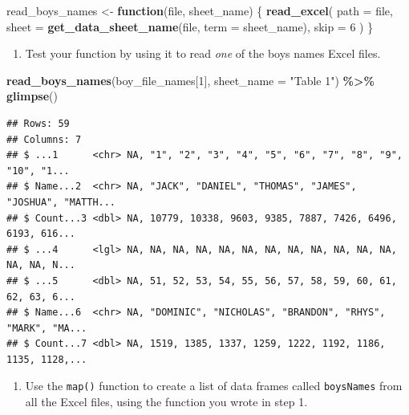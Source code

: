 \documentclass[
]{book}
\newenvironment{Shaded}{\begin{snugshade}}{\end{snugshade}}
\newcommand{\ControlFlowTok}[1]{\textcolor[rgb]{0.13,0.29,0.53}{\textbf{#1}}}
\newcommand{\DataTypeTok}[1]{\textcolor[rgb]{0.13,0.29,0.53}{#1}}
\newcommand{\DecValTok}[1]{\textcolor[rgb]{0.00,0.00,0.81}{#1}}
\newcommand{\KeywordTok}[1]{\textcolor[rgb]{0.13,0.29,0.53}{\textbf{#1}}}
\newcommand{\NormalTok}[1]{#1}
\newcommand{\OperatorTok}[1]{\textcolor[rgb]{0.81,0.36,0.00}{\textbf{#1}}}
\newcommand{\StringTok}[1]{\textcolor[rgb]{0.31,0.60,0.02}{#1}}
\providecommand{\tightlist}{%
  \setlength{\itemsep}{0pt}\setlength{\parskip}{0pt}}
\begin{document}
\begin{Shaded}
\begin{Highlighting}[]
\NormalTok{read\_boys\_names \textless{}{-}}\StringTok{ }\ControlFlowTok{function}\NormalTok{(file, sheet\_name) \{}
  \KeywordTok{read\_excel}\NormalTok{(}
    \DataTypeTok{path =}\NormalTok{ file,}
    \DataTypeTok{sheet =} \KeywordTok{get\_data\_sheet\_name}\NormalTok{(file, }\DataTypeTok{term =}\NormalTok{ sheet\_name),}
    \DataTypeTok{skip =} \DecValTok{6}
\NormalTok{  )}
\NormalTok{\}}
\end{Highlighting}
\end{Shaded}

\begin{enumerate}
\def\labelenumi{\arabic{enumi}.}
\setcounter{enumi}{1}
\tightlist
\item
  Test your function by using it to read \emph{one} of the boys names Excel files.
\end{enumerate}

\begin{Shaded}
\begin{Highlighting}[]
\KeywordTok{read\_boys\_names}\NormalTok{(boy\_file\_names[}\DecValTok{1}\NormalTok{], }\DataTypeTok{sheet\_name =} \StringTok{"Table 1"}\NormalTok{) }\OperatorTok{\%\textgreater{}\%}\StringTok{ }\KeywordTok{glimpse}\NormalTok{()}
\end{Highlighting}
\end{Shaded}

\begin{verbatim}
## Rows: 59
## Columns: 7
## $ ...1      <chr> NA, "1", "2", "3", "4", "5", "6", "7", "8", "9", "10", "1...
## $ Name...2  <chr> NA, "JACK", "DANIEL", "THOMAS", "JAMES", "JOSHUA", "MATTH...
## $ Count...3 <dbl> NA, 10779, 10338, 9603, 9385, 7887, 7426, 6496, 6193, 616...
## $ ...4      <lgl> NA, NA, NA, NA, NA, NA, NA, NA, NA, NA, NA, NA, NA, NA, N...
## $ ...5      <dbl> NA, 51, 52, 53, 54, 55, 56, 57, 58, 59, 60, 61, 62, 63, 6...
## $ Name...6  <chr> NA, "DOMINIC", "NICHOLAS", "BRANDON", "RHYS", "MARK", "MA...
## $ Count...7 <dbl> NA, 1519, 1385, 1337, 1259, 1222, 1192, 1186, 1135, 1128,...
\end{verbatim}

\begin{enumerate}
\def\labelenumi{\arabic{enumi}.}
\setcounter{enumi}{2}
\tightlist
\item
  Use the \texttt{map()} function to create a list of data frames called \texttt{boysNames} from all the Excel files, using the function you wrote in step 1.
\end{enumerate}
\end{document}
